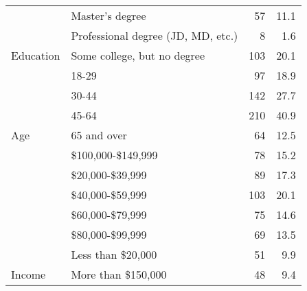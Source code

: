 \begin{table}[H]
\begin{tabular}[t]{llrr}
 & Master's degree & 57 & 11.1\\

 & Professional degree (JD, MD, etc.) & 8 & 1.6\\

\multirow[t]{-8}{*}{\raggedright\arraybackslash Education} & Some college, but no degree & 103 & 20.1\\

 & 18-29 & 97 & 18.9\\

 & 30-44 & 142 & 27.7\\

 & 45-64 & 210 & 40.9\\

\multirow[t]{-4}{*}{\raggedright\arraybackslash Age} & 65 and over & 64 & 12.5\\

 & \$100,000-\$149,999 & 78 & 15.2\\

 & \$20,000-\$39,999 & 89 & 17.3\\

 & \$40,000-\$59,999 & 103 & 20.1\\

 & \$60,000-\$79,999 & 75 & 14.6\\

 & \$80,000-\$99,999 & 69 & 13.5\\

 & Less than \$20,000 & 51 & 9.9\\

\multirow[t]{-7}{*}{\raggedright\arraybackslash Income} & More than \$150,000 & 48 & 9.4\\
\bottomrule
\end{tabular}
\end{table}
